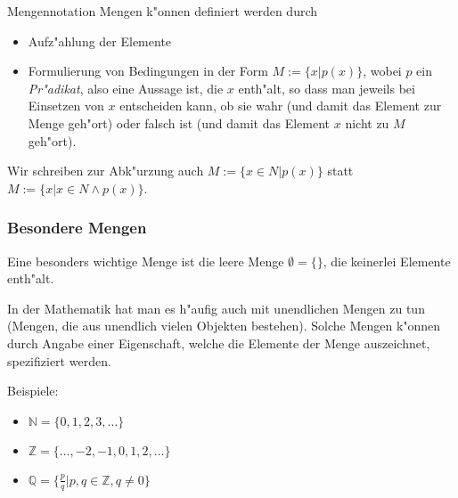\documentclass{beamer}
\begin{document}
\begin{frame}{Mengennotation}
Mengen k"onnen definiert werden durch
\begin{itemize}
  \item Aufz"ahlung der Elemente
  \item Formulierung von Bedingungen in der Form $M:=\{x|p(x)\}$, wobei $p$ ein \textit{Pr"adikat}, also eine Aussage ist, die $x$ enth"alt, so dass man jeweils bei Einsetzen von $x$ entscheiden kann, ob sie wahr (und damit das Element zur Menge geh"ort) oder falsch ist (und damit das Element $x$ nicht zu $M$ geh"ort).
\end{itemize}
  Wir schreiben zur Abk"urzung auch $M:=\{x\in N|p(x)\}$ statt $M:=\{x|x\in N\wedge p(x)\}$.
\end{frame}
\begin{frame}
  \frametitle{Besondere Mengen}
  Eine besonders wichtige Menge ist die leere Menge $\emptyset = \{\}$, die keinerlei
Elemente enth"alt.

In der Mathematik hat man es h"aufig auch mit unendlichen Mengen zu
tun (Mengen, die aus unendlich vielen Objekten bestehen).
Solche Mengen k"onnen durch Angabe einer Eigenschaft, welche die
Elemente der Menge auszeichnet, spezifiziert werden.

Beispiele:
\begin{itemize}
  \item $\mathbb{N}=\{0,1,2,3,\dots\}$
  \item $\mathbb{Z}=\{\dots,-2,-1,0,1,2,\dots\}$
  \item $\mathbb{Q}=\{\frac{p}{q}|p,q\in\mathbb{Z}, q\neq 0\}$
  
\end{itemize}
\end{frame}
\end{document}
